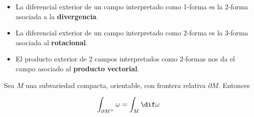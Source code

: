 \begin{itemize}
\item La diferencial exterior de un campo interpretado como 1-forma es la 2-forma asociada a la \textbf{divergencia}.
\item La diferencial exterior de un campo interpretado como 2-forma es la 3-forma asociada al \textbf{rotacional}.
\item El producto exterior de 2 campos interpretados como 2-formas nos da el campo asociado al \textbf{producto vectorial}.
\end{itemize}

\begin{theorem}
Sea $M$ una subvariedad compacta, orientable, con frontera relativa $\partial  M$. Entonces

\[\int_{\partial  M^+}\omega = \int_M \dif \omega \]

\end{theorem}